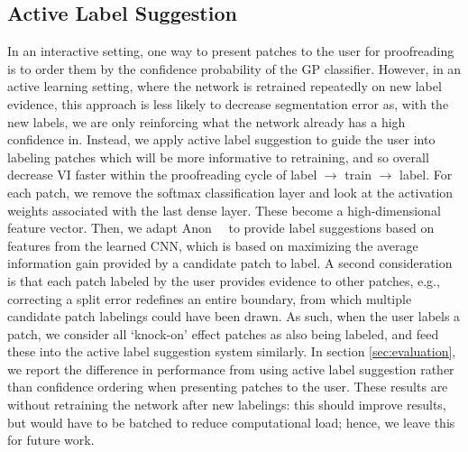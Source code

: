 \subsection{Active Label Suggestion}

In an interactive setting, one way to present patches to the user for proofreading is to order them by the confidence probability of the GP classifier. However, in an active learning setting, where the network is retrained repeatedly on new label evidence, this approach is less likely to decrease segmentation error as, with the new labels, we are only reinforcing what the network already has a high confidence in.
Instead, we apply active label suggestion to guide the user into labeling patches which will be more informative to retraining, and so overall decrease VI faster within the proofreading cycle of label $\rightarrow$ train $\rightarrow$ label. For each patch, we remove the softmax classification layer and look at the activation weights associated with the last dense layer. These become a high-dimensional feature vector. Then, we adapt Anon~\etal~\cite{ANON} to provide label suggestions based on features from the learned CNN, which is based on maximizing the average information gain provided by a candidate patch to label.
A second consideration is that each patch labeled by the user provides evidence to other patches, e.g., correcting a split error redefines an entire boundary, from which multiple candidate patch labelings could have been drawn. As such, when the user labels a patch, we consider all `knock-on' effect patches as also being labeled, and feed these into the active label suggestion system similarly.
In section \ref{sec:evaluation}, we report the difference in performance from using active label suggestion rather than confidence ordering when presenting patches to the user. These results are without retraining the network after new labelings: this should improve results, but would have to be batched to reduce computational load; hence, we leave this for future work.

 
